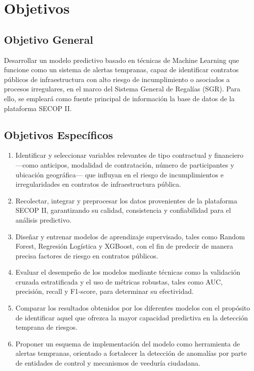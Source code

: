 \section{Objetivos}

\subsection{Objetivo General}
Desarrollar un modelo predictivo basado en técnicas de Machine Learning que funcione como un sistema de alertas tempranas, capaz de identificar contratos públicos de infraestructura con alto riesgo de incumplimiento o asociados a procesos irregulares, en el marco del Sistema General de Regalías (SGR). Para ello, se empleará como fuente principal de información la base de datos de la plataforma SECOP II.

\subsection{Objetivos Específicos}
\begin{enumerate}
    \item Identificar y seleccionar variables relevantes de tipo contractual y financiero —como anticipos, modalidad de contratación, número de participantes y ubicación geográfica— que influyan en el riesgo de incumplimientos e irregularidades en contratos de infraestructura pública.

    \item Recolectar, integrar y preprocesar los datos provenientes de la plataforma SECOP II, garantizando su calidad, consistencia y confiabilidad para el análisis predictivo.

    \item Diseñar y entrenar modelos de aprendizaje supervisado, tales como Random Forest, Regresión Logística y XGBoost, con el fin de predecir de manera precisa factores de riesgo en contratos públicos.

    \item Evaluar el desempeño de los modelos mediante técnicas como la validación cruzada estratificada y el uso de métricas robustas, tales como AUC, precisión, recall y F1-score, para determinar su efectividad.

    \item Comparar los resultados obtenidos por los diferentes modelos con el propósito de identificar aquel que ofrezca la mayor capacidad predictiva en la detección temprana de riesgos.

    \item Proponer un esquema de implementación del modelo como herramienta de alertas tempranas, orientado a fortalecer la detección de anomalías por parte de entidades de control y mecanismos de veeduría ciudadana.
\end{enumerate}